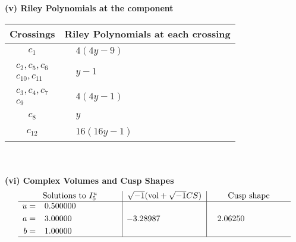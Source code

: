 \documentclass[1p]{elsarticle_modified}
\theoremstyle{definition}
\newcommand{\I}{\sqrt{-1}}
\begin{document}
\newpage\renewcommand{\arraystretch}{1}
\flushleft \textbf{(v) Riley Polynomials at the component}\newline \\
\begin{tabular}{m{50pt}|m{274pt}}
Crossings & \hspace{64pt}Riley Polynomials at each crossing \\
\hline $$\begin{aligned}c_{1}\end{aligned}$$&$\begin{aligned}
&4(4 y-9)
\end{aligned}$\\
\hline $$\begin{aligned}c_{2},c_{5},c_{6}\\c_{10},c_{11}\end{aligned}$$&$\begin{aligned}
&y-1
\end{aligned}$\\
\hline $$\begin{aligned}c_{3},c_{4},c_{7}\\c_{9}\end{aligned}$$&$\begin{aligned}
&4(4 y-1)
\end{aligned}$\\
\hline $$\begin{aligned}c_{8}\end{aligned}$$&$\begin{aligned}
&y
\end{aligned}$\\
\hline $$\begin{aligned}c_{12}\end{aligned}$$&$\begin{aligned}
&16(16 y-1)
\end{aligned}$\\
\hline
\end{tabular}\\~\\
\newpage\flushleft \textbf{(vi) Complex Volumes and Cusp Shapes}
$$\begin{array}{c|c|c}  
\text{Solutions to }I^u_{5}& \I (\text{vol} + \sqrt{-1}CS) & \text{Cusp shape}\\
 \hline 
\begin{aligned}
u &= \phantom{-}0.500000\phantom{ +0.000000I} \\
a &= \phantom{-}3.00000\phantom{ +0.000000I} \\
b &= \phantom{-}1.00000\phantom{ +0.000000I}\end{aligned}
 & -3.28987\phantom{ +0.000000I} & \phantom{-}2.06250\phantom{ +0.000000I}\\
 \hline 
 \end{array}$$\newpage
\end{document}
